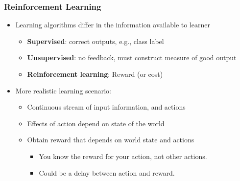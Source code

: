 \documentclass{beamer}
\renewcommand{\high}{\textbf}
\begin{document}
\begin{frame}\frametitle{Reinforcement Learning}\small
\begin{itemize}
\item Learning algorithms differ in the information available to learner
\begin{itemize}
\setlength\itemsep{1em}
\item \high{Supervised}: correct outputs, e.g., class label
\item \high{Unsupervised}: no feedback, must construct measure of good output
\item \high{Reinforcement learning}: Reward (or cost)
\end{itemize}
\item More realistic learning scenario: 
\begin{itemize}
\setlength\itemsep{1em}
\item Continuous stream of input information, and actions\\[0.7mm] 
\item Effects of action depend on state of the world\\[0.7mm] 
\item Obtain reward that depends on world state and actions\\[0.7mm] 
\begin{itemize}
\item You know the reward for your action, not other actions.
\item Could be a delay between action and reward.
\end{itemize}
\end{itemize}
\end{itemize}
\end{frame}
\end{document}
